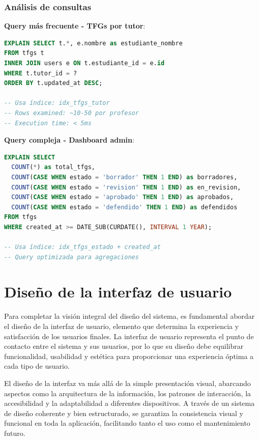 \documentclass[12pt,a4paper,oneside]{report}
\begin{document}
\subsubsection{Análisis de consultas}\label{anuxe1lisis-de-consultas}

\textbf{Query más frecuente - TFGs por tutor}:

\begin{lstlisting}[language=SQL]
EXPLAIN SELECT t.*, e.nombre as estudiante_nombre
FROM tfgs t 
INNER JOIN users e ON t.estudiante_id = e.id
WHERE t.tutor_id = ? 
ORDER BY t.updated_at DESC;

-- Usa índice: idx_tfgs_tutor
-- Rows examined: ~10-50 por profesor
-- Execution time: < 5ms
\end{lstlisting}

\textbf{Query compleja - Dashboard admin}:

\begin{lstlisting}[language=SQL]
EXPLAIN SELECT 
  COUNT(*) as total_tfgs,
  COUNT(CASE WHEN estado = 'borrador' THEN 1 END) as borradores,
  COUNT(CASE WHEN estado = 'revision' THEN 1 END) as en_revision,
  COUNT(CASE WHEN estado = 'aprobado' THEN 1 END) as aprobados,
  COUNT(CASE WHEN estado = 'defendido' THEN 1 END) as defendidos
FROM tfgs 
WHERE created_at >= DATE_SUB(CURDATE(), INTERVAL 1 YEAR);

-- Usa índice: idx_tfgs_estado + created_at
-- Query optimizada para agregaciones
\end{lstlisting}

\section{Diseño de la interfaz de
usuario}\label{diseuxf1o-de-la-interfaz-de-usuario}

Para completar la visión integral del diseño del sistema, es fundamental
abordar el diseño de la interfaz de usuario, elemento que determina la
experiencia y satisfacción de los usuarios finales. La interfaz de
usuario representa el punto de contacto entre el sistema y sus usuarios,
por lo que su diseño debe equilibrar funcionalidad, usabilidad y
estética para proporcionar una experiencia óptima a cada tipo de
usuario.

El diseño de la interfaz va más allá de la simple presentación visual,
abarcando aspectos como la arquitectura de la información, los patrones
de interacción, la accesibilidad y la adaptabilidad a diferentes
dispositivos. A través de un sistema de diseño coherente y bien
estructurado, se garantiza la consistencia visual y funcional en toda la
aplicación, facilitando tanto el uso como el mantenimiento futuro.
\end{document}
